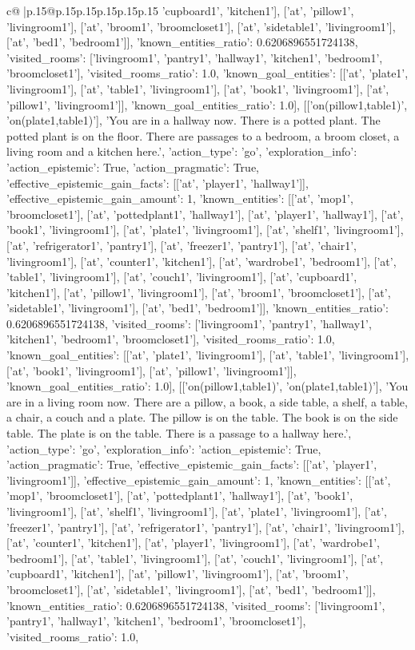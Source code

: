\documentclass{article}
\begin{document}
{\begin{supertabular}{c@{$\;$}|p{.15\linewidth}@{}p{.15\linewidth}p{.15\linewidth}p{.15\linewidth}p{.15\linewidth}p{.15\linewidth}}
{{{'cupboard1', 'kitchen1'], ['at', 'pillow1', 'livingroom1'], ['at', 'broom1', 'broomcloset1'], ['at', 'sidetable1', 'livingroom1'], ['at', 'bed1', 'bedroom1']], 'known_entities_ratio': 0.6206896551724138, 'visited_rooms': ['livingroom1', 'pantry1', 'hallway1', 'kitchen1', 'bedroom1', 'broomcloset1'], 'visited_rooms_ratio': 1.0, 'known_goal_entities': [['at', 'plate1', 'livingroom1'], ['at', 'table1', 'livingroom1'], ['at', 'book1', 'livingroom1'], ['at', 'pillow1', 'livingroom1']], 'known_goal_entities_ratio': 1.0}}], [['on(pillow1,table1)', 'on(plate1,table1)'], 'You are in a hallway now. There is a potted plant. The potted plant is on the floor. There are passages to a bedroom, a broom closet, a living room and a kitchen here.', {'action_type': 'go', 'exploration_info': {'action_epistemic': True, 'action_pragmatic': True, 'effective_epistemic_gain_facts': [['at', 'player1', 'hallway1']], 'effective_epistemic_gain_amount': 1, 'known_entities': [['at', 'mop1', 'broomcloset1'], ['at', 'pottedplant1', 'hallway1'], ['at', 'player1', 'hallway1'], ['at', 'book1', 'livingroom1'], ['at', 'plate1', 'livingroom1'], ['at', 'shelf1', 'livingroom1'], ['at', 'refrigerator1', 'pantry1'], ['at', 'freezer1', 'pantry1'], ['at', 'chair1', 'livingroom1'], ['at', 'counter1', 'kitchen1'], ['at', 'wardrobe1', 'bedroom1'], ['at', 'table1', 'livingroom1'], ['at', 'couch1', 'livingroom1'], ['at', 'cupboard1', 'kitchen1'], ['at', 'pillow1', 'livingroom1'], ['at', 'broom1', 'broomcloset1'], ['at', 'sidetable1', 'livingroom1'], ['at', 'bed1', 'bedroom1']], 'known_entities_ratio': 0.6206896551724138, 'visited_rooms': ['livingroom1', 'pantry1', 'hallway1', 'kitchen1', 'bedroom1', 'broomcloset1'], 'visited_rooms_ratio': 1.0, 'known_goal_entities': [['at', 'plate1', 'livingroom1'], ['at', 'table1', 'livingroom1'], ['at', 'book1', 'livingroom1'], ['at', 'pillow1', 'livingroom1']], 'known_goal_entities_ratio': 1.0}}], [['on(pillow1,table1)', 'on(plate1,table1)'], 'You are in a living room now. There are a pillow, a book, a side table, a shelf, a table, a chair, a couch and a plate. The pillow is on the table. The book is on the side table. The plate is on the table. There is a passage to a hallway here.', {'action_type': 'go', 'exploration_info': {'action_epistemic': True, 'action_pragmatic': True, 'effective_epistemic_gain_facts': [['at', 'player1', 'livingroom1']], 'effective_epistemic_gain_amount': 1, 'known_entities': [['at', 'mop1', 'broomcloset1'], ['at', 'pottedplant1', 'hallway1'], ['at', 'book1', 'livingroom1'], ['at', 'shelf1', 'livingroom1'], ['at', 'plate1', 'livingroom1'], ['at', 'freezer1', 'pantry1'], ['at', 'refrigerator1', 'pantry1'], ['at', 'chair1', 'livingroom1'], ['at', 'counter1', 'kitchen1'], ['at', 'player1', 'livingroom1'], ['at', 'wardrobe1', 'bedroom1'], ['at', 'table1', 'livingroom1'], ['at', 'couch1', 'livingroom1'], ['at', 'cupboard1', 'kitchen1'], ['at', 'pillow1', 'livingroom1'], ['at', 'broom1', 'broomcloset1'], ['at', 'sidetable1', 'livingroom1'], ['at', 'bed1', 'bedroom1']], 'known_entities_ratio': 0.6206896551724138, 'visited_rooms': ['livingroom1', 'pantry1', 'hallway1', 'kitchen1', 'bedroom1', 'broomcloset1'], 'visited_rooms_ratio': 1.0, }}}
\end{supertabular}}
\end{document}
